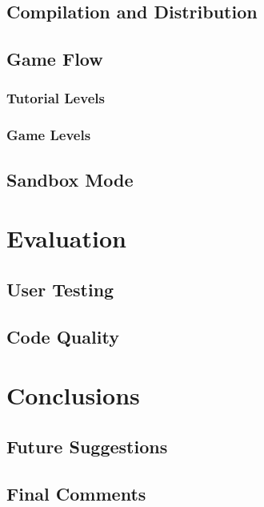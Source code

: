 \documentclass[msc,deptreport, cs]{infthesis}
\begin{document}
\section{Compilation and Distribution}

\section{Game Flow}

\subsection{Tutorial Levels}

\subsection{Game Levels}

\section{Sandbox Mode}

\chapter{Evaluation}

\section{User Testing}

\section{Code Quality}

\chapter{Conclusions}

\section{Future Suggestions}

\section{Final Comments}



\end{document}
